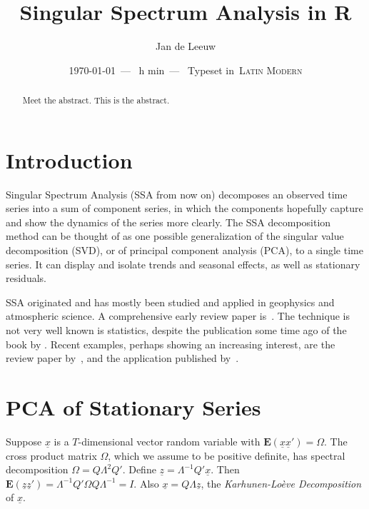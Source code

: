 \documentclass[11pt]{amsart}
\def\myfont{\textsc{Computer Modern}}
\def\myfont{\textsc{Lucida Bright}}
\def\myfont{\textsc{Palatino}}
\def\myfont{\textsc{Times Roman}}
\def\myfont{\textsc{Latin Modern}}
\theoremstyle{plain}
\theoremstyle{definition}
\theoremstyle{remark}
\newcounter{hours}
\newcounter{minutes}
\newcommand\printtime{\setcounter{hours}{\time/60}%
	\setcounter{minutes}{\time-\value{hours}*60}%
	\thehours h \theminutes min}
\begin{document}
\title{Singular Spectrum Analysis in R}
\author{Jan de Leeuw}
\address{Department of Statistics\\ University of California\\ Los Angeles, CA 90095-1554}
\ifpdf
{}
\else
{}
\fi
\date{\today\ ---\ \printtime\ --- \ Typeset in\ \myfont}
\begin{abstract}
Meet the abstract. This is the abstract.
\end{abstract}
\maketitle
\section{Introduction}
Singular Spectrum Analysis (SSA from now on) decomposes an observed time series into a sum of component series, in which the components hopefully capture and show the dynamics of the series more clearly. The SSA decomposition method can be thought of as one possible generalization of the singular value decomposition (SVD), or of principal component analysis (PCA), to a single time series. It can display and isolate trends and seasonal effects, as well as stationary residuals. 

SSA originated and has mostly been studied and applied in geophysics and atmospheric science. A comprehensive early review paper is~\citet{ghil_et_al_02}. The technique is not very well known is statistics, despite the publication some time ago of the book by \citet{golyandina_nekrutkin_zhigljavsky_01}. Recent examples, perhaps showing an increasing interest, are the review paper by~\citet{hassani_07}, and the application published by~\citet{bilancia_stea_08}.

\section{PCA of Stationary Series}
Suppose \(\underline{x}\) is a \(T\)-dimensional vector random variable with \(\mathbf{E}(\underline{x}\underline{x}')=\Omega\).
The cross product matrix \(\Omega\), which we assume to be positive definite,  has spectral decomposition \(\Omega=Q\Lambda^2 Q'\). Define
\(
\underline{z}=\Lambda^{-1}Q'\underline{x}
\).
Then \(\mathbf{E}(\underline{z}\underline{z}')=\Lambda^{-1}Q'\Omega Q\Lambda^{-1}=I\). Also \(\underline{x}=Q\Lambda\underline{z}\), 
the \emph{Karhunen-Lo\`eve Decomposition} of \(\underline{x}\).
\end{document}
